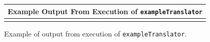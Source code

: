 {\indent
{\mySmallFontSize

\begin{latexonly}
\begin{figure}[tb]
\begin{center}
\begin{tabular}{|c|} \hline
     Example Output From Execution of {\tt exampleTranslator}
\\\hline\hline

\\\hline
\end{tabular}
\end{center}
\caption{ Example of output from execution of {\tt exampleTranslator}. }
\end{figure}
\end{latexonly}

\begin{htmlonly}
   
\end{htmlonly}

\label{usingRose:exampleTranslatorOutput}

}
}
